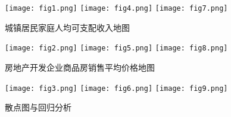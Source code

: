 \documentclass[11pt,a4paper,onecolumn]{article}
\begin{document}
\begin{figure}[H]
	\centering
	\texttt{[image: fig1.png]}
	\texttt{[image: fig4.png]}
	\texttt{[image: fig7.png]}
	\caption{城镇居民家庭人均可支配收入地图}
\end{figure}

\begin{figure}[H]
	\centering
	\texttt{[image: fig2.png]}
	\texttt{[image: fig5.png]}
	\texttt{[image: fig8.png]}
	\caption{房地产开发企业商品房销售平均价格地图}
\end{figure}

\begin{figure}[H]
	\centering
	\texttt{[image: fig3.png]}
	\texttt{[image: fig6.png]}
	\texttt{[image: fig9.png]}
	\caption{散点图与回归分析}
\end{figure}
\end{document}
